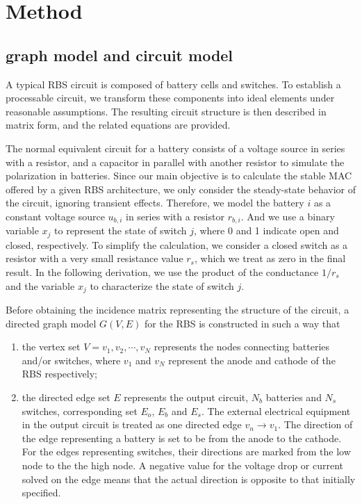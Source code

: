 \documentclass{article}
\begin{document}
\section{Method}

\subsection{graph model and circuit model}

A typical RBS circuit is composed of battery cells and switches.
To establish a processable circuit, we transform these components into ideal elements under reasonable assumptions.
The resulting circuit structure is then described in matrix form, and the related equations are provided.


The normal equivalent circuit for a battery consists of a voltage source in series with a resistor, and a capacitor in parallel with another resistor to simulate the polarization in batteries.
Since our main objective is to calculate the stable MAC offered by a given RBS architecture, we only consider the steady-state behavior of the circuit, ignoring transient effects.
Therefore, we model the battery $i$ as a constant voltage source $u_{b,i}$ in series with a resistor $r_{b,i}$.
And we use a binary variable $x_j$ to represent the state of switch $j$, where 0 and 1 indicate open and closed, respectively.
To simplify the calculation, we consider a closed switch as a resistor with a very small resistance value $r_s$, which we treat as zero in the final result.
In the following derivation, we use the product of the conductance $1/r_s$ and the variable $x_j$ to characterize the state of switch $j$.


Before obtaining the incidence matrix representing the structure of the circuit, a directed graph model $G(V,E)$ for the RBS is constructed in such a way that
\begin{enumerate}[(1)]
    \item the vertex set $V={v_1,v_2,\cdots,v_N}$ represents the nodes connecting batteries and/or switches, where $v_1$ and $v_N$ represent the anode and cathode of the RBS respectively;
    \item the directed edge set $E$ represents the output circuit, $N_b$ batteries and $N_s$ switches, corresponding set $E_o$, $E_b$ and $E_s$. The external electrical equipment in the output circuit is treated as one directed edge $v_n \to v_1$. The direction of the edge representing a battery is set to be from the anode to the cathode. For the edges representing switches, their directions are marked from the low node to the the high node. A negative value for the voltage drop or current solved on the edge means that the actual direction is opposite to that initially specified.
\end{enumerate}
\end{document}
